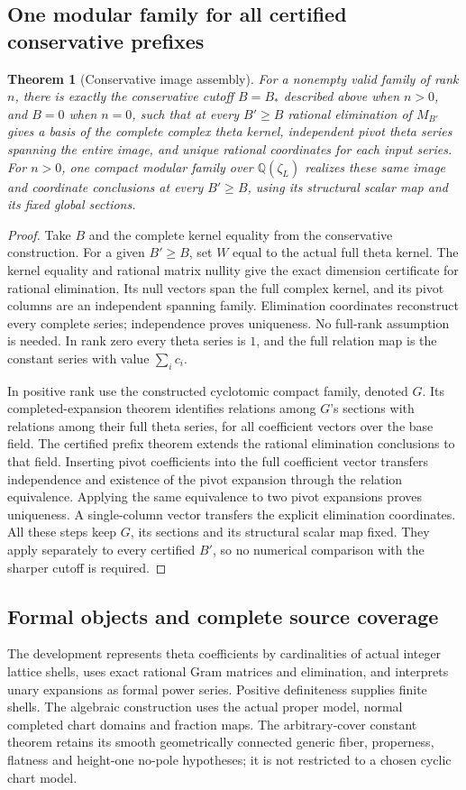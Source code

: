 \documentclass[11pt]{article}
\newtheorem{theorem}{Theorem}[section]
\theoremstyle{remark}\newtheorem{remark}[theorem]{Remark}
\begin{document}
\subsection{One modular family for all certified conservative prefixes}
\begin{theorem}[Conservative image assembly]
For a nonempty valid family of rank $n$, there is exactly the conservative
cutoff $B=B_*$ described above when $n>0$, and $B=0$ when $n=0$, such that
at every $B'\geq B$ rational elimination of $M_{B'}$ gives a basis of the
complete complex theta kernel, independent pivot theta series spanning the
entire image, and unique rational coordinates for each input series.
For $n>0$, one compact modular family over $\mathbb Q(\zeta_L)$ realizes
these same image and coordinate conclusions at every $B'\geq B$, using
its structural scalar map and its fixed global sections.
\end{theorem}
\begin{proof}
Take $B$ and the complete kernel equality from the conservative construction.
For a given $B'\geq B$, set $W$ equal to the actual full theta kernel.
The kernel equality and rational matrix nullity give the exact dimension
certificate for rational elimination. Its null vectors span the full complex
kernel, and its pivot columns are an independent spanning family. Elimination
coordinates reconstruct every complete series; independence proves uniqueness.
No full-rank assumption is needed. In rank zero every theta series is $1$,
and the full relation map is the constant series with value $\sum_i c_i$.

In positive rank use the constructed cyclotomic compact family, denoted $G$.
Its completed-expansion theorem identifies relations among $G$'s sections
with relations among their full theta series, for all coefficient vectors
over the base field. The certified prefix theorem extends the rational
elimination conclusions to that field. Inserting pivot coefficients into the
full coefficient vector transfers independence and existence of the pivot
expansion through the relation equivalence. Applying the same equivalence
to two pivot expansions proves uniqueness. A single-column vector transfers
the explicit elimination coordinates. All these steps keep $G$, its sections
and its structural scalar map fixed. They apply separately to every certified
$B'$, so no numerical comparison with the sharper cutoff is required.
\end{proof}

\subsection{Formal objects and complete source coverage}
The development represents theta coefficients by cardinalities of actual
integer lattice shells, uses exact rational Gram matrices and elimination,
and interprets unary expansions as formal power series. Positive definiteness
supplies finite shells. The algebraic construction uses the actual proper
model, normal completed chart domains and fraction maps. The arbitrary-cover
constant theorem retains its smooth geometrically connected generic fiber,
properness, flatness and height-one no-pole hypotheses; it is not restricted
to a chosen cyclic chart model.
\end{document}
